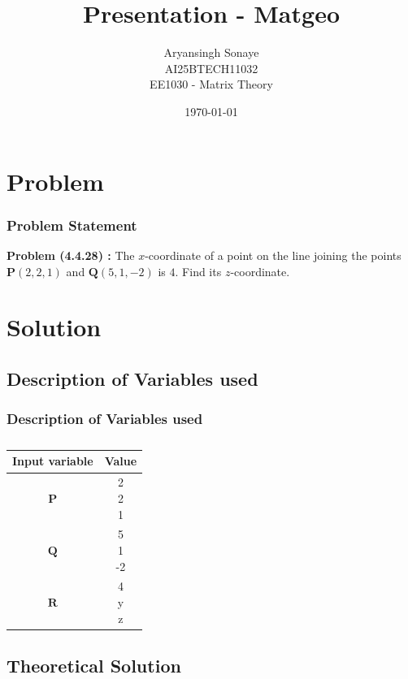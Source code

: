 \documentclass{beamer}
\title{Presentation - Matgeo}
\author{Aryansingh Sonaye \\
AI25BTECH11032 \\
EE1030 - Matrix Theory}
\date{\today}
\theoremstyle{remark}
\newcommand{\myvec}[1]{\ensuremath{\begin{pmatrix}#1\end{pmatrix}}}
\let\vec\mathbf
\numberwithin{equation}{section}
\begin{document}
\begin{frame}
\titlepage
\end{frame}

\section{Problem}
\begin{frame}
\frametitle{Problem Statement}
\textbf{Problem (4.4.28) :} The $x$-coordinate of a point on the line joining the points 
$\vec{P}(2,2,1)$ and $\vec{Q}(5,1,-2)$ is $4$. Find its $z$-coordinate.
\end{frame}

\section{Solution}
\subsection{Description of Variables used}
\begin{frame}
\frametitle{Description of Variables used}
\begin{table}[H]
\centering
\begin{tabular}[12pt]{ |c| c|}
    \hline
    \textbf{Input variable} & \textbf{Value}\\ 
    \hline
    $\vec{P}$ & \myvec{2 \\2 \\1} \\
    \hline 
    $\vec{Q}$ & \myvec{5 \\1 \\-2}\\
    \hline
    $\vec{R}$ & \myvec{4 \\y \\z}\\
    \hline
    \end{tabular}
    \caption{}
    \label{}
 \end{table}


\end{frame}

\subsection{Theoretical Solution }
\end{document}
